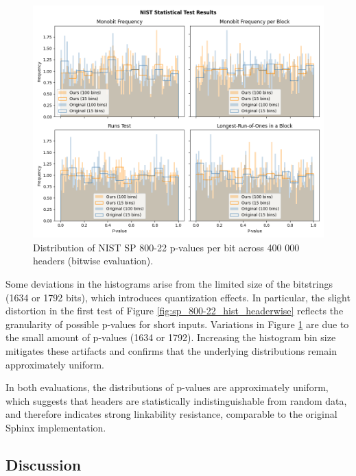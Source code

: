 \begin{figure}[H]
    \centering
    \includegraphics[width=0.9\linewidth]{Images/25-05-19-bitwise_comparison_400000h-20n-3m-3p5.png}
    \caption{Distribution of NIST SP 800-22 p-values per bit across 400 000 headers (bitwise evaluation).}
    \label{fig:sp_800-22_hist_bitwise}
\end{figure}

Some deviations in the histograms arise from the limited size of the bitstrings (1634 or 1792 bits), which introduces quantization effects. 
In particular, the slight distortion in the first test of Figure \ref{fig:sp_800-22_hist_headerwise} reflects the granularity of possible p-values for short inputs. 
Variations in Figure \ref{fig:sp_800-22_hist_bitwise} are due to the small amount of p-values (1634 or 1792).
Increasing the histogram bin size mitigates these artifacts and confirms that the underlying distributions remain approximately uniform.

In both evaluations, the distributions of p-values are approximately uniform, which suggests that headers are statistically indistinguishable from random data, 
and therefore indicates strong linkability resistance, comparable to the original Sphinx implementation.

\subsection{Discussion}


